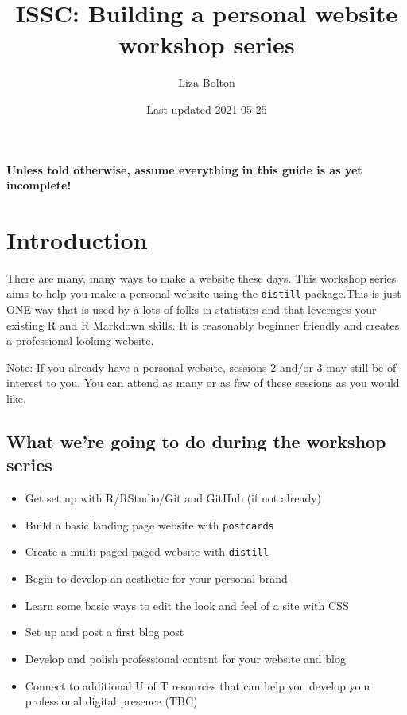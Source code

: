 \documentclass[
]{article}
\title{ISSC: Building a personal website workshop series}
\author{Liza Bolton}
\date{Last updated 2021-05-25}
\providecommand{\tightlist}{%
  \setlength{\itemsep}{0pt}\setlength{\parskip}{0pt}}
\begin{document}
\maketitle

{
\setcounter{tocdepth}{2}
\tableofcontents
}
\textbf{Unless told otherwise, assume everything in this guide is as yet incomplete!}

\hypertarget{introduction}{%
\section{Introduction}\label{introduction}}

There are many, many ways to make a website these days. This workshop series aims to help you make a personal website using the \href{https://rstudio.github.io/distill/}{\texttt{distill} package}.This is just ONE way that is used by a lots of folks in statistics and that leverages your existing R and R Markdown skills. It is reasonably beginner friendly and creates a professional looking website.

Note: If you already have a personal website, sessions 2 and/or 3 may still be of interest to you. You can attend as many or as few of these sessions as you would like.

\hypertarget{what-were-going-to-do-during-the-workshop-series}{%
\subsection{What we're going to do during the workshop series}\label{what-were-going-to-do-during-the-workshop-series}}

\begin{itemize}
\tightlist
\item
  Get set up with R/RStudio/Git and GitHub (if not already)
\item
  Build a basic landing page website with \texttt{postcards}
\item
  Create a multi-paged paged website with \texttt{distill}
\item
  Begin to develop an aesthetic for your personal brand
\item
  Learn some basic ways to edit the look and feel of a site with CSS
\item
  Set up and post a first blog post
\item
  Develop and polish professional content for your website and blog
\item
  Connect to additional U of T resources that can help you develop your professional digital presence (TBC)
\end{itemize}
\end{document}
